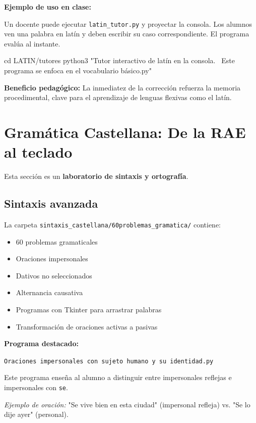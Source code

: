 \documentclass[12pt,spanish]{article}
\newcommand{\programa}[1]{\texttt{\color{color2}#1}}
\begin{document}
\begin{ejemplo}
\textbf{Ejemplo de uso en clase:}

Un docente puede ejecutar \programa{latin\_tutor.py} y proyectar la consola. Los alumnos ven una palabra en latín y deben escribir su caso correspondiente. El programa evalúa al instante.

\begin{codigo}
cd LATIN/tutores
python3 "Tutor interactivo de latín en la consola. \
Este programa se enfoca en el vocabulario básico.py"
\end{codigo}
\end{ejemplo}

\begin{nota}
\textbf{Beneficio pedagógico:} La inmediatez de la corrección refuerza la memoria procedimental, clave para el aprendizaje de lenguas flexivas como el latín.
\end{nota}

\section{Gramática Castellana: De la RAE al teclado}

Esta sección es un \textbf{laboratorio de sintaxis y ortografía}.

\subsection{Sintaxis avanzada}

La carpeta \texttt{sintaxis\_castellana/60problemas\_gramatica/} contiene:

\begin{itemize}
    \item 60 problemas gramaticales
    \item Oraciones impersonales
    \item Dativos no seleccionados
    \item Alternancia causativa
    \item Programas con Tkinter para arrastrar palabras
    \item Transformación de oraciones activas a pasivas
\end{itemize}

\begin{ejemplo}
\textbf{Programa destacado:}

\programa{Oraciones impersonales con sujeto humano y su identidad.py}

Este programa enseña al alumno a distinguir entre impersonales reflejas e impersonales con \texttt{se}.

\textit{Ejemplo de oración:} "Se vive bien en esta ciudad" (impersonal refleja) vs. "Se lo dije ayer" (personal).
\end{ejemplo}
\end{document}
